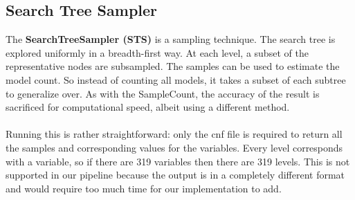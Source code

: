 \subsection{Search Tree Sampler}

The \textbf{SearchTreeSampler (STS)} is a sampling technique. The search tree is explored uniformly in a breadth-first way. At each level, a subset of the representative nodes are subsampled. The samples can be used to estimate the model count. So instead of counting all models, it takes a subset of each subtree to generalize over. As with the SampleCount, the accuracy of the result is sacrificed for computational speed, albeit using a different method.
\\\\
Running this is rather straightforward: only the cnf file is required to return all the samples and corresponding values for the variables. Every level corresponds with a variable, so if there are 319 variables then there are 319 levels. This is not supported in our pipeline because the output is in a completely different format and would require too much time for our implementation to add. 
